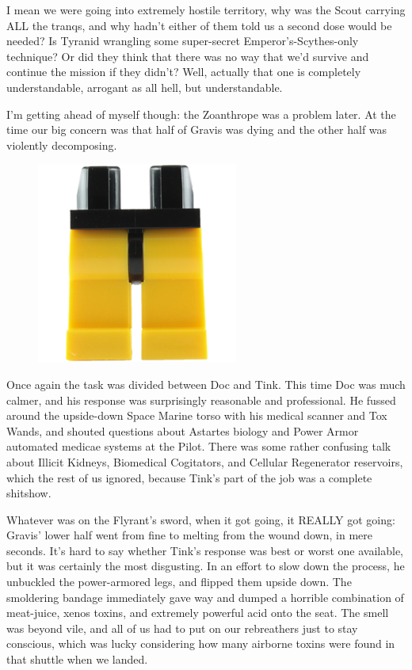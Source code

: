I mean we were going into extremely hostile territory, why was the Scout carrying ALL the tranqs, and why hadn't either of them told us a second dose would be needed? 
Is Tyranid wrangling some super-secret Emperor's-Scythes-only technique? 
Or did they think that there was no way that we'd survive and continue the mission if they didn't? 
Well, actually that one is completely understandable, arrogant as all hell, but understandable.

I'm getting ahead of myself though: 
the Zoanthrope was a problem later. 
At the time our big concern was that half of Gravis was dying and the other half was violently decomposing.
\begin{figure}
	\begin{center}
		\includegraphics[width=\figwidth]{pics/12/61.png}
	\end{center}
\end{figure}
Once again the task was divided between Doc and Tink. 
This time Doc was much calmer, and his response was surprisingly reasonable and professional. 
He fussed around the upside-down Space Marine torso with his medical scanner and Tox Wands, and shouted questions about Astartes biology and Power Armor automated medicae systems at the Pilot. 
There was some rather confusing talk about Illicit Kidneys, Biomedical Cogitators, and Cellular Regenerator reservoirs, which the rest of us ignored, because Tink's part of the job was a complete shitshow.

Whatever was on the Flyrant's sword, when it got going, it REALLY got going: 
Gravis' lower half went from fine to melting from the wound down, in mere seconds. 
It's hard to say whether Tink's response was best or worst one available, but it was certainly the most disgusting. 
In an effort to slow down the process, he unbuckled the power-armored legs, and flipped them upside down. 
The smoldering bandage immediately gave way and dumped a horrible combination of meat-juice, xenos toxins, and extremely powerful acid onto the seat. 
The smell was beyond vile, and all of us had to put on our rebreathers just to stay conscious, which was lucky considering how many airborne toxins were found in that shuttle when we landed.

